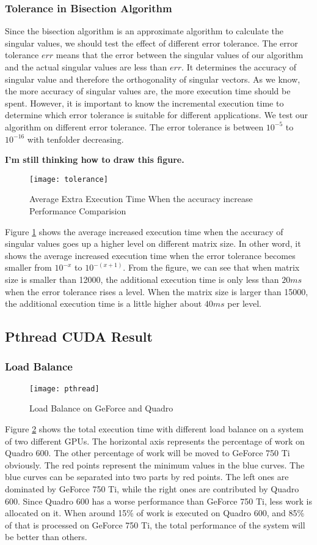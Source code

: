 \subsubsection{Tolerance in Bisection Algorithm}
Since the bisection algorithm is an approximate algorithm to calculate the singular values, we should test the effect of different error tolerance.
The error tolerance $err$ means that the error between the singular values of our algorithm and the actual singular values are less than $err$.
It determines the accuracy of singular value and therefore the orthogonality of singular vectors.
As we know, the more accuracy of singular values are, the more execution time should be spent.
However, it is important to know the incremental execution time to determine which error tolerance is suitable for different applications.
We test our algorithm on different error tolerance.
The error tolerance is between $10^{-5}$ to $10^{-16}$ with tenfolder decreasing.

\textbf{I'm still thinking how to draw this figure.}
\begin{figure}[hbpt]
\centering
\texttt{[image: tolerance]}
\caption{Average Extra Execution Time When the accuracy increase Performance Comparision}
\label{fig:tolerance}
\end{figure}
Figure \ref{fig:tolerance} shows the average increased execution time when the accuracy of singular values goes up a higher level on different matrix size.
In other word, it shows the average increased execution time when the error tolerance becomes smaller from $10^{-x}$ to $10^{-(x+1)}$.
From the figure, we can see that when matrix size is smaller than 12000, the additional execution time is only less than $20 ms$ when the error tolerance rises a level.
When the matrix size is larger than 15000, the additional execution time is a little higher about $40 ms$ per level.

\subsection{Pthread CUDA Result}
\subsubsection{Load Balance}
\begin{figure}[hbpt]
\centering
\texttt{[image: pthread]}
\caption{Load Balance on GeForce and Quadro}
\label{fig:pthread}
\end{figure}
Figure \ref{fig:pthread} shows the total execution time with different load balance on a system of two different GPUs.
The horizontal axis represents the percentage of work on Quadro 600.
The other percentage of work will be moved to GeForce 750 Ti obviously.
The red points represent the minimum values in the blue curves.
The blue curves can be separated into two parts by red points.
The left ones are dominated by GeForce 750 Ti, while the right ones are contributed by Quadro 600.
Since Quadro 600 has a worse performance than GeForce 750 Ti, less work is allocated on it.
When around 15\% of work is executed on Quadro 600, and 85\% of that is processed on GeForce 750 Ti,
the total performance of the system will be better than others.

